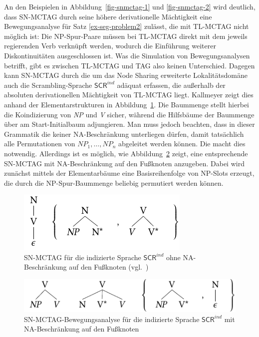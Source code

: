 An den Beispielen in Abbildung~\ref{fig-snmctag-1} und \ref{fig-snmctag-2} wird deutlich, dass SN-MCTAG durch seine höhere derivationelle Mächtigkeit eine Bewegungsanalyse für Satz \ref{ex-seg-problem2} zulässt, die mit TL-MCTAG nicht möglich ist: Die NP-Spur-Paare müssen bei TL-MCTAG direkt mit dem jeweils regierenden Verb verknüpft werden, wodurch die Einführung weiterer Diskontinuitäten ausgeschlossen ist. Was die Simulation von Bewegungsanalysen betrifft, gibt es zwischen TL-MCTAG und TAG also keinen Unterschied. Dagegen kann SN-MCTAG durch die um das Node Sharing erweiterte Lokalitätsdomäne auch die Scrambling-Sprache $\mathsf{SCR}^{ind}$ adäquat erfassen, die au\ss erhalb der absoluten derivationellen Mächtigkeit von TL-MCTAG liegt. Kallmeyer zeigt dies anhand der Elementarstrukturen in Abbildung~\ref{fig-snmctag-3}. Die Baummenge stellt hierbei die Koindizierung von \textit{NP} und \textit{V} sicher, während die Hilfsbäume der Baummenge über  am Start-Initialbaum adjungieren. Man muss jedoch beachten, dass in dieser Grammatik die  keiner NA-Beschränkung unterliegen dürfen, damit tatsächlich alle Permutationen von $\mathit{NP}_1, \ldots, \mathit{NP}_n$ abgeleitet werden können. Die  macht dies notwendig. Allerdings ist es möglich, wie Abbildung~\ref{fig-snmctag-4} zeigt, eine entsprechende SN-MCTAG mit NA-Beschränkung auf den Fu\ss knoten anzugeben. Dabei wird zunächst mittels der Elementarbäume eine Basisreihenfolge von NP-Slots erzeugt, die durch die NP-Spur-Baummenge beliebig permutiert werden können. 

\begin{figure}[t]
\centering
\includegraphics{graphics/abb617.pdf}
\caption{SN-MCTAG für die indizierte Sprache $\mathsf{SCR}^{ind}$ ohne NA-Beschränkung auf den Fu\ss knoten (vgl.\ \citealt[Abbildung~5]{Kallmeyer:05})\label{fig-snmctag-3}} 
\end{figure}

\begin{figure}[t]
\centering
\includegraphics{graphics/abb618.pdf}
\caption{SN-MCTAG-Bewegungsanalyse für die indizierte Sprache $\mathsf{SCR}^{ind}$  mit NA-Beschränkung auf den Fu\ss knoten\label{fig-snmctag-4}}
\end{figure}

